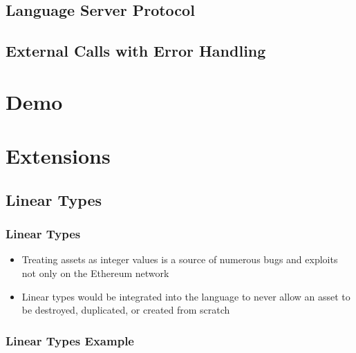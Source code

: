 \documentclass{beamer}
\begin{document}
\subsection{Language Server Protocol}
\subsection{External Calls with Error Handling}
\section{Demo}

\section{Extensions}
\subsection{Linear Types}

\begin{frame}
\frametitle{Linear Types}
\begin{itemize}
    \item Treating assets as integer values is a source of numerous bugs and exploits not only on the Ethereum network
    \item Linear types would be integrated into the language to never allow an asset to be destroyed, duplicated, or created from scratch
\end{itemize}
\end{frame}

\begin{frame}
\frametitle{Linear Types Example}
\inputminted{swift}{code/linear-types.flint}
\end{frame}

\end{document}
